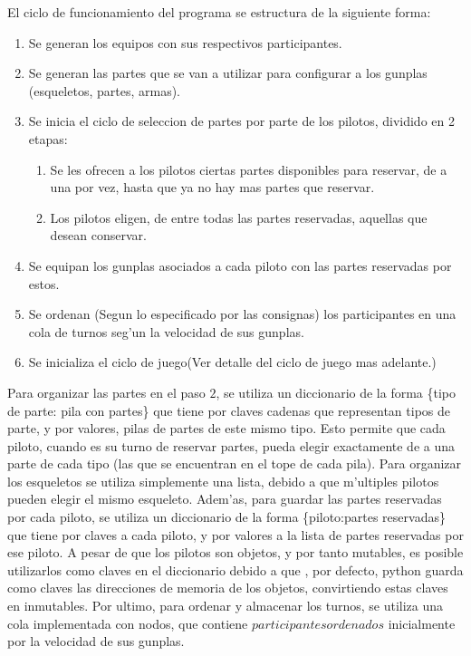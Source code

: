 \documentclass[12pt]{article}
\begin{document}
		El ciclo de funcionamiento del programa se estructura de la siguiente forma:

		\begin{enumerate}
			\item Se generan los equipos con sus respectivos participantes. 
			\item Se generan las partes que se van a utilizar para configurar a los gunplas (esqueletos, partes, armas).
			\item Se inicia el ciclo de seleccion de partes por parte de los pilotos, dividido en 2 etapas:
			\begin{enumerate}
				\item Se les ofrecen a los pilotos ciertas partes disponibles para reservar, de a una por vez, hasta que ya no hay mas partes que reservar.
				\item Los pilotos eligen, de entre todas las partes reservadas, aquellas que desean conservar.
			\end{enumerate}
			\item Se equipan los gunplas asociados a cada piloto con las partes reservadas por estos.
			\item Se ordenan (Segun lo especificado por las consignas) los participantes en una cola de turnos seg'un la velocidad
			de sus gunplas.
			\item Se inicializa el ciclo de juego(Ver detalle del ciclo de juego mas adelante.)
		\end{enumerate}

		Para organizar las partes en el paso $2$, se utiliza un diccionario de la forma \{tipo de parte: pila con partes\} que tiene por claves 
		cadenas que representan tipos de parte, y por valores, pilas de partes de este mismo tipo. Esto permite que cada piloto, cuando es su turno de reservar partes, pueda elegir exactamente de a una parte de cada tipo (las que se encuentran en el tope de cada pila). Para organizar los esqueletos se utiliza simplemente una lista, debido a que m'ultiples pilotos pueden elegir el mismo esqueleto. 
		Adem'as, para guardar las partes reservadas por cada piloto, se utiliza un diccionario de la forma \{piloto:partes reservadas\}
		que tiene por claves a cada piloto, y por valores a la lista de partes reservadas por ese piloto. A pesar de que los pilotos son objetos, y por tanto mutables, es posible utilizarlos como claves en el diccionario debido a que , por defecto, python guarda como claves las direcciones de memoria de los objetos, convirtiendo estas claves en inmutables. Por ultimo, para ordenar y almacenar los turnos, se utiliza una cola implementada con nodos, que contiene $participantes ordenados$ inicialmente por la velocidad de sus gunplas.
\end{document}
